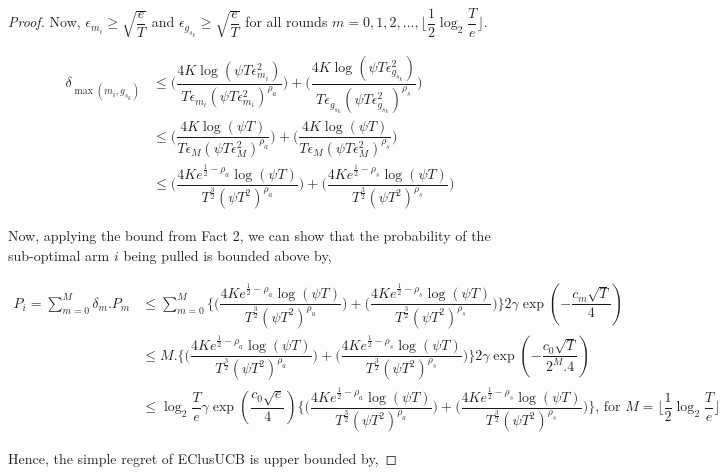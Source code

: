 \begin{proof}
Now, $\epsilon_{m_{i}}\geq \sqrt{\dfrac{e}{T}}$ and $\epsilon_{g_{s_{k}}}\geq \sqrt{\dfrac{e}{T}}$ for all rounds $m=0,1,2,...,\big \lfloor \dfrac{1}{2}\log_{2} \dfrac{T}{e}\big\rfloor$.

\begin{align*}
\delta_{\max(m_{i},g_{s_{k}})} &\leq \bigg(\dfrac{4K\log (\psi T \epsilon_{m_{i}}^{2})}{T\epsilon_{m_{i}}(\psi T\epsilon_{m_{i}}^{2})^{\rho_{a}}}\bigg) + \bigg(\dfrac{4K\log (\psi T \epsilon_{g_{s_{k}}}^{2})}{T\epsilon_{g_{s_{k}}}(\psi  T\epsilon_{g_{s_{k}}}^{2})^{\rho_{s}}}\bigg)\\
& \leq \bigg(\dfrac{4K\log (\psi T )}{T\epsilon_{M}(\psi T\epsilon_{M}^{2})^{\rho_{a}}}\bigg) + \bigg(\dfrac{4K\log (\psi T )}{T\epsilon_{M}(\psi  T\epsilon_{M}^{2})^{\rho_{s}}}\bigg)\\
& \leq \bigg(\dfrac{4Ke^{\frac{1}{2}-\rho_{a}}\log (\psi T )}{T^{\frac{3}{2}}(\psi T^2)^{\rho_{a}}}\bigg) + \bigg(\dfrac{4Ke^{\frac{1}{2}-\rho_{s}}\log (\psi T )}{T^{\frac{3}{2}}(\psi T^2)^{\rho_{s}}}\bigg)
\end{align*}

Now, applying the bound from Fact 2, we can show that the probability of the sub-optimal arm $i$ being pulled is bounded above by,

\begin{align*}
P_{i} = \sum_{m=0}^{M} \delta_{m}.P_{m} &\leq \sum_{m=0}^{M} \bigg\lbrace\bigg(\dfrac{4Ke^{\frac{1}{2}-\rho_{a}}\log (\psi T )}{T^{\frac{3}{2}}(\psi T^2)^{\rho_{a}}}\bigg) + \bigg(\dfrac{4Ke^{\frac{1}{2}-\rho_{s}}\log (\psi T )}{T^{\frac{3}{2}}(\psi T^2)^{\rho_{s}}}\bigg)\bigg\rbrace 2\gamma \exp(-\dfrac{c_{m}\sqrt{T}}{4})\\
& \leq M.\bigg\lbrace\bigg(\dfrac{4Ke^{\frac{1}{2}-\rho_{a}}\log (\psi T )}{T^{\frac{3}{2}}(\psi T^2)^{\rho_{a}}}\bigg) + \bigg(\dfrac{4Ke^{\frac{1}{2}-\rho_{s}}\log (\psi T )}{T^{\frac{3}{2}}(\psi T^2)^{\rho_{s}}}\bigg)\bigg\rbrace 2\gamma \exp(-\dfrac{c_{0}\sqrt{T}}{2^{M}.4})\\
& \leq \log_{2}\dfrac{T}{e}\gamma \exp(\dfrac{c_{0}\sqrt{e}}{4})\bigg\lbrace\bigg(\dfrac{4Ke^{\frac{1}{2}-\rho_{a}}\log (\psi T )}{T^{\frac{3}{2}}(\psi T^2)^{\rho_{a}}}\bigg) + \bigg(\dfrac{4Ke^{\frac{1}{2}-\rho_{s}}\log (\psi T )}{T^{\frac{3}{2}}(\psi T^2)^{\rho_{s}}}\bigg)\bigg\rbrace \text{, for $M=\big \lfloor \dfrac{1}{2}\log_{2} \dfrac{T}{e}\big\rfloor$}
\end{align*}

Hence, the simple regret of EClusUCB is upper bounded by,


\end{proof}
